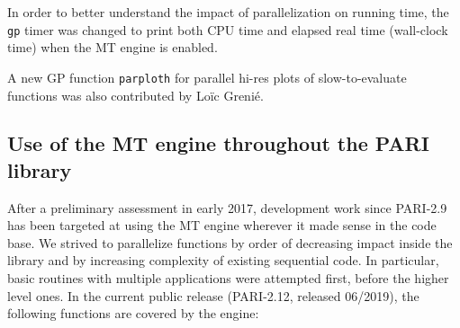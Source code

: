 \documentclass{deliverablereport}
\begin{document}
In order to better understand the impact of parallelization on running time,
the \texttt{gp} timer was changed to
print both CPU time and elapsed real time (wall-clock time) when the MT
engine is enabled.

A new GP function \texttt{parploth} for parallel hi-res plots of
slow-to-evaluate functions was also contributed by Lo\"ic Greni\'e.

\subsection{Use of the MT engine throughout the PARI library}
After a preliminary assessment in early 2017,
development work since PARI-2.9 has been targeted at using the MT engine
wherever it made sense in the \Pari code base.
We strived to parallelize functions by order of decreasing
impact inside the \Pari library and by increasing complexity of existing
sequential code. In particular, basic routines with multiple applications
were attempted first, before the higher level ones. In the current public
release (PARI-2.12, released 06/2019), the following functions are covered by
the engine:
\end{document}
